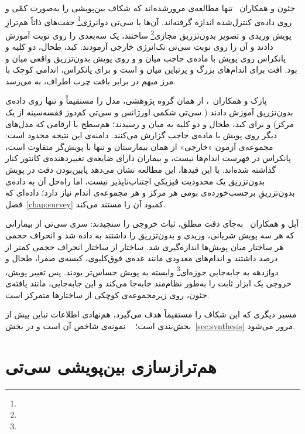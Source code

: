 جئون و همکاران~\cite{jeon2024fully} تنها مطالعه‌ی مرورشده‌اند که شکاف بین‌پویشی را به‌صورت کمّی و روی داده‌ی کنترل‌شده اندازه گرفته‌اند. آن‌ها با سی‌تی دوانرژی\footnote{} جفت‌های ذاتاً هم‌ترازِ پویش وریدی و تصویر بدون‌تزریق مجازی\footnote{} ساختند، یک  سه‌بعدی را روی  نوبت آموزش دادند و آن را روی  نوبت سی‌تی تک‌انرژی خارجی آزمودند.  کبد، طحال، دو کلیه و پانکراس روی پویش با ماده‌ی حاجب میان  و  و روی پویش بدون‌تزریق واقعی میان  و  بود. افت برای اندام‌های بزرگ و پرتباین میان  و  است و برای پانکراس، اندامی کوچک با مرز مبهم در برابر بافت چرب اطراف، به  می‌رسد.

پارک و همکاران~\cite{park2025nect}، از همان گروه پژوهشی، مدل را مستقیماً و تنها روی داده‌ی بدون‌تزریق آموزش دادند ( سی‌تی شکمی اورژانس و  سی‌تی کم‌دوز قفسه‌سینه از یک مرکز) و برای کبد، طحال و دو کلیه به  میان  و  رسیدند؛ هم‌سطح با ارقامی که مدل‌های دیگر روی پویش با ماده‌ی حاجب گزارش می‌کنند. دامنه‌ی این نتیجه محدود است: مجموعه‌ی آزمون «خارجی» از همان بیمارستان و تنها با پویش‌گر متفاوت است، پانکراس در فهرست اندام‌ها نیست، و بیماران دارای ضایعه‌ی تغییردهنده‌ی کانتور کنار گذاشته شده‌اند. با این قیدها، این مطالعه نشان می‌دهد پایین‌بودن دقت در پویش بدون‌تزریق یک محدودیت فیزیکی اجتناب‌ناپذیر نیست، اما راه‌حل آن به داده‌ی بدون‌تزریقِ برچسب‌خورده‌ی بومی هر مرکز و هر مجموعه‌ی اندام نیاز دارد؛ داده‌ای که فصل~\ref{chap:survey} کمبود آن را مستند می‌کند.

آبل و همکاران~\cite{abel2025intraindividual} به‌جای دقت مطلق، ثبات خروجی را سنجیدند:  سری سی‌تی از بیمارانی که هر سه پویش شریانی، وریدی و بدون‌تزریق را داشتند به  داده شد و انحراف حجمی هر ساختار میان پویش‌ها اندازه‌گیری شد.  ساختار از  ساختار انحراف حجمی کمتر از  درصد داشتند و اندام‌های معدودی مانند غده‌ی فوق‌کلیوی، کیسه‌ی صفرا، طحال و دوازدهه به جابه‌جایی حوزه‌ای\footnote{} وابسته به پویش حساس‌تر بودند. پس تغییر پویش، خروجی یک ابزار ثابت را به‌طور نظام‌مند جابه‌جا می‌کند و این جابه‌جایی، مانند یافته‌ی جئون، روی زیرمجموعه‌ی کوچکی از ساختارها متمرکز است.

مسیر دیگری که این شکاف را مستقیماً هدف می‌گیرد، هم‌نهادی اطلاعات تباین پیش از بخش‌بندی است؛ ~\cite{Zho24} نمونه‌ی شاخص آن است و در بخش~\ref{sec:synthesis} مرور می‌شود.


\section{هم‌ترازسازی بین‌پویشی سی‌تی}
\label{sec:registration}

